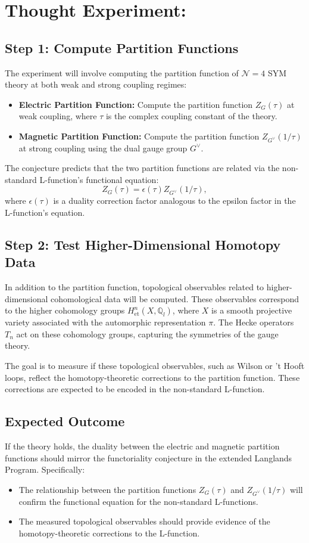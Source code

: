 \documentclass{article}
\theoremstyle{remark}
\begin{document}
\section{Thought Experiment:}
\subsection{Step 1: Compute Partition Functions}
The experiment will involve computing the partition function of $\mathcal{N}=4$ SYM theory at both weak and strong coupling regimes:
\begin{itemize}
    \item \textbf{Electric Partition Function:} Compute the partition function $Z_G(\tau)$ at weak coupling, where $\tau$ is the complex coupling constant of the theory.
    \item \textbf{Magnetic Partition Function:} Compute the partition function $Z_{G^\vee}(1/\tau)$ at strong coupling using the dual gauge group $G^\vee$.
\end{itemize}
The conjecture predicts that the two partition functions are related via the non-standard L-function's functional equation:
\[
Z_G(\tau) = \epsilon(\tau) Z_{G^\vee}(1/\tau),
\]
where $\epsilon(\tau)$ is a duality correction factor analogous to the epsilon factor in the L-function's equation.

\subsection{Step 2: Test Higher-Dimensional Homotopy Data}
In addition to the partition function, topological observables related to higher-dimensional cohomological data will be computed. These observables correspond to the higher cohomology groups $H^n_{\text{et}}(X, \mathbb{Q}_l)$, where $X$ is a smooth projective variety associated with the automorphic representation $\pi$. The Hecke operators $T_n$ act on these cohomology groups, capturing the symmetries of the gauge theory.

The goal is to measure if these topological observables, such as Wilson or 't Hooft loops, reflect the homotopy-theoretic corrections to the partition function. These corrections are expected to be encoded in the non-standard L-function.

\subsection{Expected Outcome}
If the theory holds, the duality between the electric and magnetic partition functions should mirror the functoriality conjecture in the extended Langlands Program. Specifically:
\begin{itemize}
    \item The relationship between the partition functions $Z_G(\tau)$ and $Z_{G^\vee}(1/\tau)$ will confirm the functional equation for the non-standard L-functions.
    \item The measured topological observables should provide evidence of the homotopy-theoretic corrections to the L-function.
\end{itemize}
\end{document}
